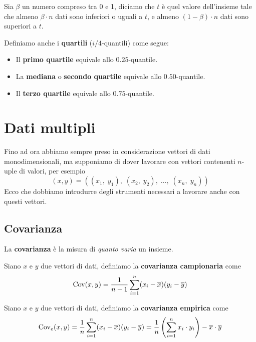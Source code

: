 \begin{definition}
	Sia $\beta$ un numero compreso tra 0 e 1, diciamo che $t$ è quel valore dell'insieme tale che almeno
	$\beta \cdot n$ dati sono inferiori o uguali a $t$, e almeno $(1-\beta) \cdot n$ dati sono superiori a $t$.
\end{definition}

\begin{definition}
	Definiamo anche i \textbf{quartili} ($i/4$-quantili) come segue:
	\begin{itemize}
		\item Il \textbf{primo quartile} equivale allo $0.25$-quantile.
		\item La \textbf{mediana} o \textbf{secondo quartile} equivale allo $0.50$-quantile.
		\item Il \textbf{terzo quartile} equivale allo $0.75$-quantile.
	\end{itemize}
\end{definition}

\section{Dati multipli}
Fino ad ora abbiamo sempre preso in considerazione vettori di dati monodimensionali, ma supponiamo di dover
lavorare con vettori contenenti $n$-uple di valori, per esempio
\[ (x, y) = ((x_1, \; y_1), \; (x_2, \; y_2), \; \dots, \; (x_n, \; y_n)) \]
Ecco che dobbiamo introdurre degli strumenti necessari a lavorare anche con questi vettori.

\subsection{Covarianza}
La \textbf{covarianza} è la misura di \emph{quanto varia} un insieme.

\begin{definition}
	Siano $x$  e $y$ due vettori di dati, definiamo la \textbf{covarianza campionaria} come
	\[ \operatorname{Cov}(x, y) = \frac{1}{n - 1} \sum_{i=1}^n (x_i - \overline{x}) (y_i - \overline{y}) \]
\end{definition}

\begin{definition}
	Siano $x$  e $y$ due vettori di dati, definiamo la \textbf{covarianza empirica} come
	\[
		\operatorname{Cov}_e(x, y) = \frac{1}{n} \sum_{i=1}^n (x_i - \overline{x}) (y_i - \overline{y}) =
		\frac{1}{n} \left( \sum_{i=1}^n x_i \cdot y_i \right) - \overline{x} \cdot \overline{y}
	\]
\end{definition}

